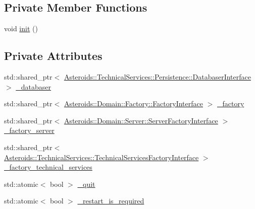\subsection*{Private Member Functions}
\begin{DoxyCompactItemize}
\item 
void \hyperlink{classAsteroids_1_1Domain_1_1Server_1_1ServerDaemon_ae9c4ad2dfbabb9f2f2fbd84fbf5940a5}{init} ()
\end{DoxyCompactItemize}
\subsection*{Private Attributes}
\begin{DoxyCompactItemize}
\item 
std\+::shared\+\_\+ptr$<$ \hyperlink{classAsteroids_1_1TechnicalServices_1_1Persistence_1_1DatabaserInterface}{Asteroids\+::\+Technical\+Services\+::\+Persistence\+::\+Databaser\+Interface} $>$ \hyperlink{classAsteroids_1_1Domain_1_1Server_1_1ServerDaemon_a2856346a9011cc7b717142527fd2a1f8}{\+\_\+databaser}
\item 
std\+::shared\+\_\+ptr$<$ \hyperlink{classAsteroids_1_1Domain_1_1Factory_1_1FactoryInterface}{Asteroids\+::\+Domain\+::\+Factory\+::\+Factory\+Interface} $>$ \hyperlink{classAsteroids_1_1Domain_1_1Server_1_1ServerDaemon_a5e09fd6503ac3ef9aa3ef18c71e3b4f0}{\+\_\+factory}
\item 
std\+::shared\+\_\+ptr$<$ \hyperlink{classAsteroids_1_1Domain_1_1Server_1_1ServerFactoryInterface}{Asteroids\+::\+Domain\+::\+Server\+::\+Server\+Factory\+Interface} $>$ \hyperlink{classAsteroids_1_1Domain_1_1Server_1_1ServerDaemon_ae95b464f2464935d75b4107e49b4112b}{\+\_\+factory\+\_\+server}
\item 
std\+::shared\+\_\+ptr$<$ \hyperlink{classAsteroids_1_1TechnicalServices_1_1TechnicalServicesFactoryInterface}{Asteroids\+::\+Technical\+Services\+::\+Technical\+Services\+Factory\+Interface} $>$ \hyperlink{classAsteroids_1_1Domain_1_1Server_1_1ServerDaemon_a21b2047b38269d597241695ea8a92e87}{\+\_\+factory\+\_\+technical\+\_\+services}
\item 
std\+::atomic$<$ bool $>$ \hyperlink{classAsteroids_1_1Domain_1_1Server_1_1ServerDaemon_a8e5f1c6809bbe3290bb85fafc6562058}{\+\_\+quit}
\item 
std\+::atomic$<$ bool $>$ \hyperlink{classAsteroids_1_1Domain_1_1Server_1_1ServerDaemon_a841bf5530b6ae5d6cbc89d50a4280f0c}{\+\_\+restart\+\_\+is\+\_\+required}
\end{DoxyCompactItemize}


